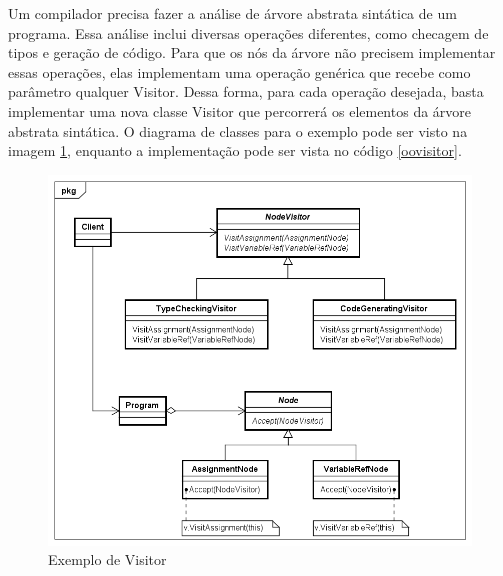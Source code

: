 Um compilador precisa fazer a análise de árvore abstrata sintática de 
um programa. Essa análise inclui diversas operações diferentes, como 
checagem de tipos e geração de código. Para que os nós da árvore 
não precisem implementar essas operações, elas implementam uma operação 
genérica que recebe como parâmetro qualquer Visitor. Dessa forma, para 
cada operação desejada, basta implementar uma nova classe Visitor 
que percorrerá os elementos da árvore abstrata sintática. O diagrama 
de classes para o exemplo pode ser visto na imagem \ref{visitor_exemplo1}, 
enquanto a implementação pode ser vista no código \ref{oovisitor}.

\begin{figure}[htb]
	\caption{\label{visitor_exemplo1}Exemplo de Visitor}
	\begin{center}
	    \includegraphics[scale=0.5]{5_padroes-contexto-funcional/5.3_comportamentais/5.3.11_visitor/visitor_exemplo.png}
	\end{center}
\end{figure}


